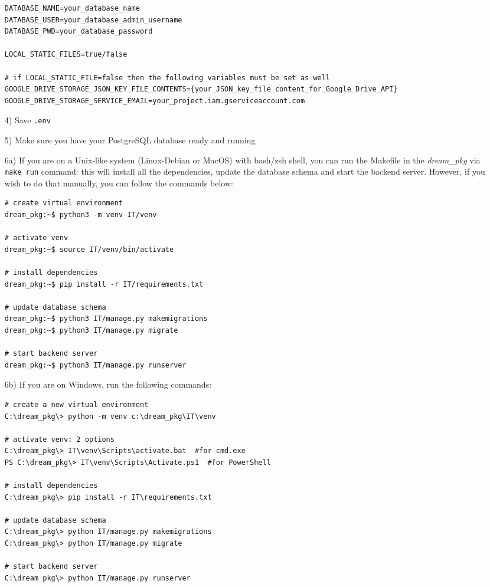 \documentclass[table, 12pt]{article}
\begin{document}
\begin{itemize}
\begin{lstlisting}[language=shell]
DATABASE_NAME=your_database_name
DATABASE_USER=your_database_admin_username
DATABASE_PWD=your_database_password

LOCAL_STATIC_FILES=true/false

# if LOCAL_STATIC_FILE=false then the following variables must be set as well
GOOGLE_DRIVE_STORAGE_JSON_KEY_FILE_CONTENTS={your_JSON_key_file_content_for_Google_Drive_API}
GOOGLE_DRIVE_STORAGE_SERVICE_EMAIL=your_project.iam.gserviceaccount.com
    \end{lstlisting}  
    \item[4)] Save \texttt{.env}
    \item[5)] Make sure you have your PostgreSQL database ready and running
    \item[6a)] If you are on a Unix-like system (Linux-Debian or MacOS) with bash/zsh shell, you can run the Makefile in the \textit{dream\_pkg} via \texttt{make run} command: this will install all the dependencies, update the database schema and start the backend server. However, if you wish to do that manually, you can follow the commands below:
    \begin{lstlisting}[language=shell]
# create virtual environment
dream_pkg:~$ python3 -m venv IT/venv

# activate venv
dream_pkg:~$ source IT/venv/bin/activate

# install dependencies
dream_pkg:~$ pip install -r IT/requirements.txt

# update database schema
dream_pkg:~$ python3 IT/manage.py makemigrations
dream_pkg:~$ python3 IT/manage.py migrate

# start backend server
dream_pkg:~$ python3 IT/manage.py runserver
    \end{lstlisting}
    \item[6b)] If you are on Windows, run the following commands:
    \begin{lstlisting}[language=shell]
# create a new virtual environment
C:\dream_pkg\> python -m venv c:\dream_pkg\IT\venv

# activate venv: 2 options
C:\dream_pkg\> IT\venv\Scripts\activate.bat  #for cmd.exe
PS C:\dream_pkg\> IT\venv\Scripts\Activate.ps1  #for PowerShell
  
# install dependencies
C:\dream_pkg\> pip install -r IT\requirements.txt

# update database schema
C:\dream_pkg\> python IT/manage.py makemigrations
C:\dream_pkg\> python IT/manage.py migrate

# start backend server
C:\dream_pkg\> python IT/manage.py runserver
    \end{lstlisting}
\end{itemize}
\end{document}
